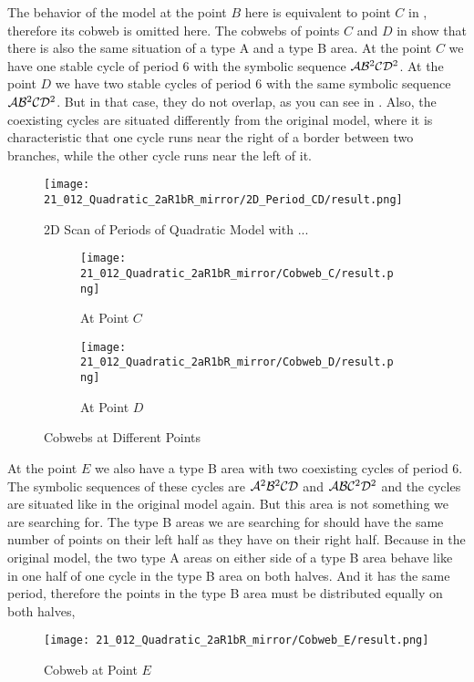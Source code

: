 The behavior of the model at the point $B$ here is equivalent to point $C$ in , therefore its cobweb is omitted here.
The cobwebs of points $C$ and $D$ in  show that there is also the same situation of a type A and a type B area.
At the point $C$ we have one stable cycle of period 6 with the symbolic sequence $\mathcal{A}\mathcal{B}^2\mathcal{C}\mathcal{D}^2$.
At the point $D$ we have two stable cycles of period 6 with the same symbolic sequence $\mathcal{A}\mathcal{B}^2\mathcal{C}\mathcal{D}^2$.
But in that case, they do not overlap, as you can see in .
Also, the coexisting cycles are situated differently from the original model, where it is characteristic that one cycle runs near the right of a border between two branches, while the other cycle runs near the left of it.

\begin{figure}
    \centering
    \texttt{[image: 21\_012\_Quadratic\_2aR1bR\_mirror/2D\_Period\_CD/result.png]}
    \caption{2D Scan of Periods of Quadratic Model with ...}
    \label{fig:quadratic.full.2aR1bR_mirr.1.2d.CD}
\end{figure}

\begin{figure}
    \centering
    \begin{subfigure}{0.4\textwidth}
        \centering
        \texttt{[image: 21\_012\_Quadratic\_2aR1bR\_mirror/Cobweb\_C/result.png]}
        \caption{At Point $C$}
        \label{fig:quad.full.2aR1bR_cL_mirr.1.CobwebC}
    \end{subfigure}
    \begin{subfigure}{0.4\textwidth}
        \centering
        \texttt{[image: 21\_012\_Quadratic\_2aR1bR\_mirror/Cobweb\_D/result.png]}
        \caption{At Point $D$}
        \label{fig:quad.full.2aR1bR_cL_mirr.1.CobwebD}
    \end{subfigure}
    \caption{Cobwebs at Different Points}
    \label{fig:quad.full.2aR1bR_cL_mirr.1.CobwebsCD}
\end{figure}

At the point $E$ we also have a type B area with two coexisting cycles of period 6.
The symbolic sequences of these cycles are $\mathcal{A}^2\mathcal{B}^2\mathcal{C}\mathcal{D}$ and $\mathcal{A}\mathcal{B}\mathcal{C}^2\mathcal{D}^2$ and the cycles are situated like in the original model again.
But this area is not something we are searching for.
The type B areas we are searching for should have the same number of points on their left half as they have on their right half.
Because in the original model, the two type A areas on either side of a type B area behave like in one half of one cycle in the type B area on both halves.
And it has the same period, therefore the points in the type B area must be distributed equally on both halves,

\begin{figure}
    \centering
    \texttt{[image: 21\_012\_Quadratic\_2aR1bR\_mirror/Cobweb\_E/result.png]}
    \caption{Cobweb at Point $E$}
    \label{fig:quadratic.full.2aR1bR_mirr.1.CobwebE}
\end{figure}

